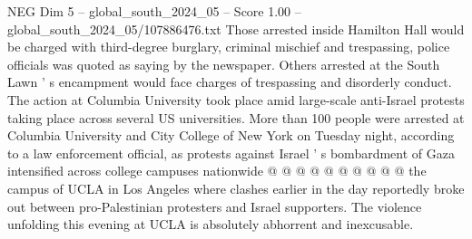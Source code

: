 \begin{textsample}{NEG Dim 5 – global\_south\_2024\_05 – Score 1.00 – global\_south\_2024\_05/107886476.txt}
Those arrested inside Hamilton Hall would be charged with third-degree burglary, criminal mischief and trespassing, police officials was quoted as saying by the newspaper.
Others arrested at the South Lawn ' s encampment would face charges of trespassing and disorderly conduct.
The action at Columbia University took place amid large-scale anti-Israel protests taking place across several US universities.
More than 100 people were arrested at Columbia University and City College of New York on Tuesday night, according to a law enforcement official, as protests against Israel ' s bombardment of Gaza intensified across college campuses nationwide @ @ @ @ @ @ @ @ @ @ the campus of UCLA in Los Angeles where clashes earlier in the day reportedly broke out between pro-Palestinian protesters and Israel supporters.
The violence unfolding this evening at UCLA is absolutely abhorrent and inexcusable.

\end{textsample}
